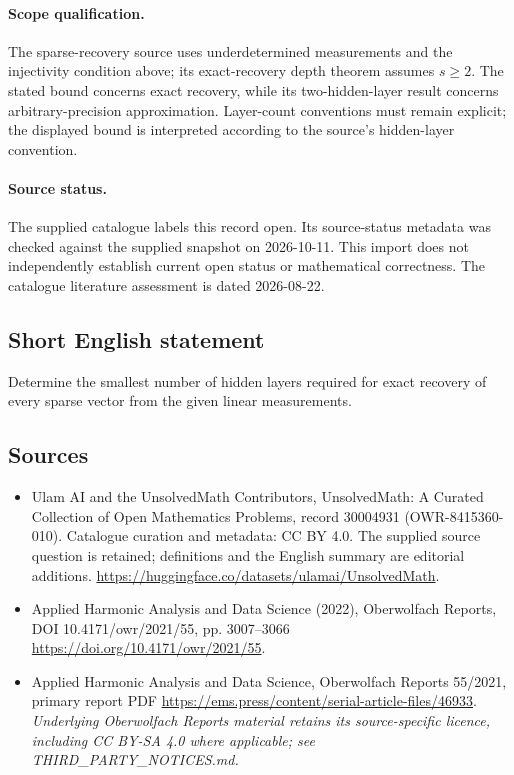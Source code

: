\documentclass[11pt]{article}
\begin{document}
\paragraph{Scope qualification.}
The sparse-recovery source uses underdetermined measurements and the injectivity condition above; its exact-recovery depth theorem assumes $s\geq2$. The stated bound concerns exact recovery, while its two-hidden-layer result concerns arbitrary-precision approximation. Layer-count conventions must remain explicit; the displayed bound is interpreted according to the source's hidden-layer convention.
\paragraph{Source status.}
The supplied catalogue labels this record open. Its source-status metadata was checked against the supplied snapshot on 2026-10-11. This import does not independently establish current open status or mathematical correctness. The catalogue literature assessment is dated 2026-08-22.
\subsection{Short English statement}
Determine the smallest number of hidden layers required for exact recovery of every sparse vector from the given linear measurements.
\subsection{Sources}
\begin{itemize}
\item[S1] Ulam AI and the UnsolvedMath Contributors, UnsolvedMath: A Curated Collection of Open Mathematics Problems, record 30004931 (OWR-8415360-010). Catalogue curation and metadata: CC BY 4.0. The supplied source question is retained; definitions and the English summary are editorial additions.
\url{https://huggingface.co/datasets/ulamai/UnsolvedMath}.
\item[S2] Applied Harmonic Analysis and Data Science (2022), Oberwolfach Reports, DOI 10.4171/owr/2021/55, pp. 3007--3066
\url{https://doi.org/10.4171/owr/2021/55}.
\item[S3] Applied Harmonic Analysis and Data Science, Oberwolfach Reports 55/2021, primary report PDF
\url{https://ems.press/content/serial-article-files/46933}.
\textit{Underlying Oberwolfach Reports material retains its source-specific licence, including CC BY-SA 4.0 where applicable; see THIRD\_PARTY\_NOTICES.md.}
\end{itemize}
\end{document}
